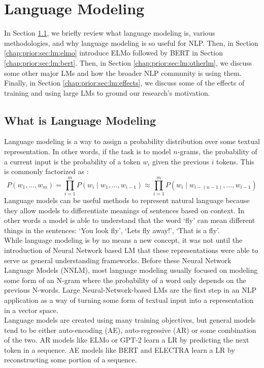 \section{Language Modeling}
\label{chap:prior:sec:lm}
In Section \ref{chap:prior:sec:lm:overview}, we briefly review what language modeling is, various methodologies, and why language modeling is so useful for NLP. Then, in Section \ref{chap:prior:sec:lm:elmo} introduce ELMo followed by BERT in Section \ref{chap:prior:sec:lm:bert}. Then, in Section \ref{chap:prior:sec:lm:otherlm}, we discuss some other major LMs and how the broader NLP community is using them. Finally, in Section \ref{chap:prior:sec:lm:effects}, we discuss some of the effects of training and using large LMs to ground our research's motivation.
\subsection{What is Language Modeling}
\label{chap:prior:sec:lm:overview}
Language modeling is a way to assign a probability distribution over some textual representation. In other words, if the task is to model $n$-grams, the probability of a current input is the probability of a token $w_i$ given the previous $i$ tokens. This is commonly factorized as :
\begin{equation}
    P(w_{1},\ldots ,w_{m})=\prod _{i=1}^{m}P(w_{i}\mid w_{1},\ldots ,w_{i-1})\approx \prod _{i=1}^{m}P(w_{i}\mid w_{i-(n-1)},\ldots ,w_{i-1})
\label{equation:langmodel}
\end{equation} Language models can be useful methods to represent natural language because they allow models to differentiate meanings of sentences based on context. In other words a model is able to understand that the word `fly' can mean different things in the sentences: `You look fly', `Lets fly away!', `That is a fly'. \\
While language modeling is by no means a new concept, it was not until the introduction of Neural Network based LM that these representations were able to serve as general understanding frameworks. Before these Neural Network Language Models (NNLM), most language modeling usually focused on modeling some form of an N-gram where the probability of a word only depends on the previous N-words. Large Neural-Network-based LMs are the first step in an NLP application as a way of turning some form of textual input into a representation in a vector space. \\
Language models are created using many training objectives, but general models tend to be either auto-encoding (AE), auto-regressive (AR) or some combination of the two. AR models like ELMo \cite{Peters2018DeepCW} or GPT-2 \cite{Radford2019LanguageMA} learn a LR by predicting the next token in a sequence. AE models like BERT \cite{Devlin2019BERTPO} and ELECTRA \cite{Clark2020ELECTRAPT} learn a LR by reconstructing some portion of a sequence.
